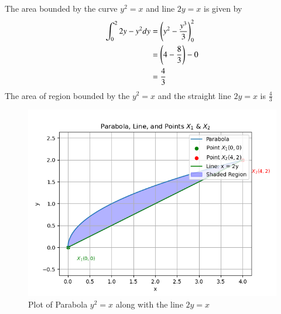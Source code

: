 \documentclass[journal]{IEEEtran}
\begin{document}
The area bounded by the curve $y^2 = x$ and line $2y = x$ is given by
\begin{align}
    \int_{0}^{2} 2y-y^2 dy &= \left(y^2-\frac{y^3}{3}\right)_{0}^{2} \\
    &= \left(4-\frac{8}{3}\right)-0\\
    &= \frac{4}{3} 
\end{align}
The area of region bounded by the $y^2 = x$ and the straight line $2y = x$ is $\frac{4}{3}$
\begin{figure}[h]
    \centering
    \includegraphics[width=\columnwidth]{figs/fig.png}
    \caption{Plot of Parabola $y^2 = x$ along with the line $2y = x$}
 \end{figure}
\end{document}
